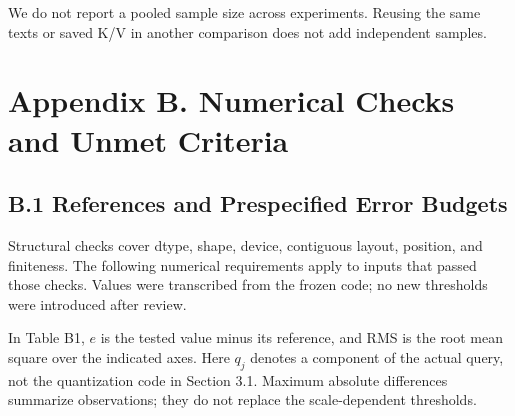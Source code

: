 \documentclass[10pt,a4paper]{article}
\begin{document}
We do not report a pooled sample size across experiments. Reusing the same texts or saved K/V in another comparison does not add independent samples.

\section{Appendix B. Numerical Checks and Unmet Criteria}\label{appendix-b.-numerical-checks-and-unmet-criteria}

\subsection{B.1 References and Prespecified Error Budgets}\label{b.1-references-and-prespecified-error-budgets}

Structural checks cover dtype, shape, device, contiguous layout, position, and finiteness. The following numerical requirements apply to inputs that passed those checks. Values were transcribed from the frozen code; no new thresholds were introduced after review.

In Table B1, \(e\) is the tested value minus its reference, and RMS is the root mean square over the indicated axes. Here \(q_j\) denotes a component of the actual query, not the quantization code in Section 3.1. Maximum absolute differences summarize observations; they do not replace the scale-dependent thresholds.
\end{document}
